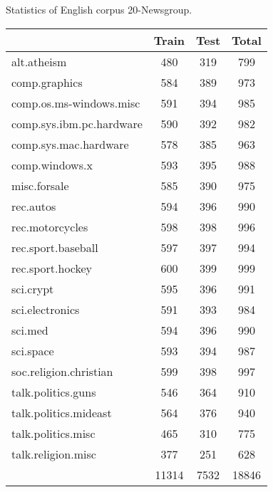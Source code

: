 \centering
\caption{Statistics of English corpus 20-Newsgroup.}
\begin{tabular}{|l|c|c|c|}
\hline
                            & Train & Test & Total \\ \hline
alt.atheism                 & 480   & 319  & 799   \\ \hline
comp.graphics               & 584   & 389  & 973   \\ \hline
comp.os.ms-windows.misc     & 591   & 394  & 985   \\ \hline
comp.sys.ibm.pc.hardware    & 590   & 392  & 982   \\ \hline
comp.sys.mac.hardware       & 578   & 385  & 963   \\ \hline
comp.windows.x              & 593   & 395  & 988   \\ \hline
misc.forsale                & 585   & 390  & 975   \\ \hline
rec.autos                   & 594   & 396  & 990   \\ \hline
rec.motorcycles             & 598   & 398  & 996   \\ \hline
rec.sport.baseball          & 597   & 397  & 994   \\ \hline
rec.sport.hockey            & 600   & 399  & 999   \\ \hline
sci.crypt                   & 595   & 396  & 991   \\ \hline
sci.electronics             & 591   & 393  & 984   \\ \hline
sci.med                     & 594   & 396  & 990   \\ \hline
sci.space                   & 593   & 394  & 987   \\ \hline
soc.religion.christian      & 599   & 398  & 997   \\ \hline
talk.politics.guns          & 546   & 364  & 910   \\ \hline
talk.politics.mideast       & 564   & 376  & 940   \\ \hline
talk.politics.misc          & 465   & 310  & 775   \\ \hline
talk.religion.misc          & 377   & 251  & 628   \\ \hline
                            & 11314 & 7532 & 18846 \\ \hline
\end{tabular}
